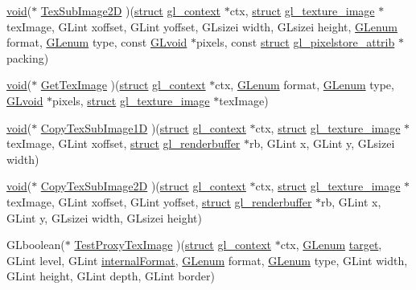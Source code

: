 \begin{Indent}
\begin{DoxyCompactItemize}
\item 
\hyperlink{interfacevoid}{void}($\ast$ \hyperlink{structdd__function__table_ac5d434d3f197b6bd61e01311145d7244}{Tex\+Sub\+Image2D} )(\hyperlink{interfacestruct}{struct} \hyperlink{structgl__context}{gl\+\_\+context} $\ast$ctx, \hyperlink{interfacestruct}{struct} \hyperlink{structgl__texture__image}{gl\+\_\+texture\+\_\+image} $\ast$tex\+Image, G\+Lint xoffset, G\+Lint yoffset, G\+Lsizei width, G\+Lsizei height, \hyperlink{interfacevoid}{G\+Lenum} format, \hyperlink{interfacevoid}{G\+Lenum} type, const \hyperlink{interfacevoid}{G\+Lvoid} $\ast$pixels, const \hyperlink{interfacestruct}{struct} \hyperlink{structgl__pixelstore__attrib}{gl\+\_\+pixelstore\+\_\+attrib} $\ast$packing)
\item 
\hyperlink{interfacevoid}{void}($\ast$ \hyperlink{structdd__function__table_a0b9a6f027a3472d9ca293bf3e7a703cd}{Get\+Tex\+Image} )(\hyperlink{interfacestruct}{struct} \hyperlink{structgl__context}{gl\+\_\+context} $\ast$ctx, \hyperlink{interfacevoid}{G\+Lenum} format, \hyperlink{interfacevoid}{G\+Lenum} type, \hyperlink{interfacevoid}{G\+Lvoid} $\ast$pixels, \hyperlink{interfacestruct}{struct} \hyperlink{structgl__texture__image}{gl\+\_\+texture\+\_\+image} $\ast$tex\+Image)
\item 
\hyperlink{interfacevoid}{void}($\ast$ \hyperlink{structdd__function__table_a1f3b0bba4691f2f2d8338ad804aa948a}{Copy\+Tex\+Sub\+Image1D} )(\hyperlink{interfacestruct}{struct} \hyperlink{structgl__context}{gl\+\_\+context} $\ast$ctx, \hyperlink{interfacestruct}{struct} \hyperlink{structgl__texture__image}{gl\+\_\+texture\+\_\+image} $\ast$tex\+Image, G\+Lint xoffset, \hyperlink{interfacestruct}{struct} \hyperlink{structgl__renderbuffer}{gl\+\_\+renderbuffer} $\ast$rb, G\+Lint x, G\+Lint y, G\+Lsizei width)
\item 
\hyperlink{interfacevoid}{void}($\ast$ \hyperlink{structdd__function__table_a25e3ba53790920affc41a135e4c5b42b}{Copy\+Tex\+Sub\+Image2D} )(\hyperlink{interfacestruct}{struct} \hyperlink{structgl__context}{gl\+\_\+context} $\ast$ctx, \hyperlink{interfacestruct}{struct} \hyperlink{structgl__texture__image}{gl\+\_\+texture\+\_\+image} $\ast$tex\+Image, G\+Lint xoffset, G\+Lint yoffset, \hyperlink{interfacestruct}{struct} \hyperlink{structgl__renderbuffer}{gl\+\_\+renderbuffer} $\ast$rb, G\+Lint x, G\+Lint y, G\+Lsizei width, G\+Lsizei height)
\item 
G\+Lboolean($\ast$ \hyperlink{structdd__function__table_a6bde3f45be48a994c069fd106d1add4e}{Test\+Proxy\+Tex\+Image} )(\hyperlink{interfacestruct}{struct} \hyperlink{structgl__context}{gl\+\_\+context} $\ast$ctx, \hyperlink{interfacevoid}{G\+Lenum} \hyperlink{interfacevoid}{target}, G\+Lint level, G\+Lint \hyperlink{interfacevoid}{internal\+Format}, \hyperlink{interfacevoid}{G\+Lenum} format, \hyperlink{interfacevoid}{G\+Lenum} type, G\+Lint width, G\+Lint height, G\+Lint depth, G\+Lint border)
\end{DoxyCompactItemize}
\end{Indent}
